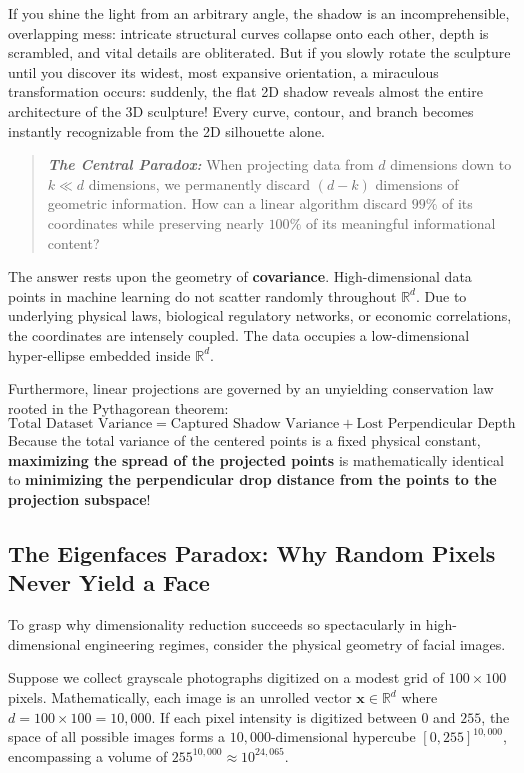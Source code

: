 If you shine the light from an arbitrary angle, the shadow is an incomprehensible, overlapping mess: intricate structural curves collapse onto each other, depth is scrambled, and vital details are obliterated. But if you slowly rotate the sculpture until you discover its widest, most expansive orientation, a miraculous transformation occurs: suddenly, the flat 2D shadow reveals almost the entire architecture of the 3D sculpture! Every curve, contour, and branch becomes instantly recognizable from the 2D silhouette alone.

\begin{quote}
\textit{\textbf{The Central Paradox:}} When projecting data from $d$ dimensions down to $k \ll d$ dimensions, we permanently discard $(d - k)$ dimensions of geometric information. How can a linear algorithm discard $99\%$ of its coordinates while preserving nearly $100\%$ of its meaningful informational content?
\end{quote}

The answer rests upon the geometry of \textbf{covariance}. High-dimensional data points in machine learning do not scatter randomly throughout $\mathbb{R}^d$. Due to underlying physical laws, biological regulatory networks, or economic correlations, the coordinates are intensely coupled. The data occupies a low-dimensional hyper-ellipse embedded inside $\mathbb{R}^d$.

Furthermore, linear projections are governed by an unyielding conservation law rooted in the Pythagorean theorem:
\begin{equation}
\text{Total Dataset Variance} = \text{Captured Shadow Variance} + \text{Lost Perpendicular Depth}
\end{equation}
Because the total variance of the centered points is a fixed physical constant, \textbf{maximizing the spread of the projected points} is mathematically identical to \textbf{minimizing the perpendicular drop distance from the points to the projection subspace}!

\subsection{The Eigenfaces Paradox: Why Random Pixels Never Yield a Face}
To grasp why dimensionality reduction succeeds so spectacularly in high-dimensional engineering regimes, consider the physical geometry of facial images. 

Suppose we collect grayscale photographs digitized on a modest grid of $100 \times 100$ pixels. Mathematically, each image is an unrolled vector $\mathbf{x} \in \mathbb{R}^{d}$ where $d = 100 \times 100 = 10{,}000$. If each pixel intensity is digitized between $0$ and $255$, the space of all possible images forms a $10{,}000$-dimensional hypercube $[0, 255]^{10{,}000}$, encompassing a volume of $255^{10{,}000} \approx 10^{24{,}065}$.


